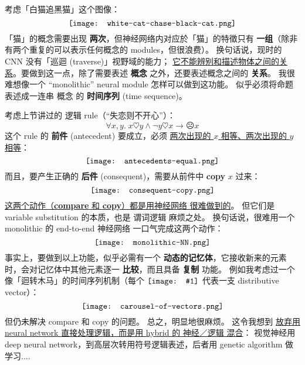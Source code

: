 \documentclass[12pt, orivec]{article}
\newcommand*\NewSym[1]{\vcenter{\hbox{\texttt{[image: \#1]}}}}
\begin{document}
考虑「白猫追黑猫」这个图像：
\begin{equation}
\vcenter{\hbox{\texttt{[image: white-cat-chase-black-cat.png]}}}
\end{equation}
「猫」的概念需要出现 \textbf{两次}，但神经网络内对应於「猫」的特徵只有 \textbf{一组}（除非有两个重复的可以表示任何概念的 modules，但很浪费）。 换句话说，现时的 CNN 没有「巡迴 (traverse)」视野域的能力； \uline{它不能辨别和描述物体之间的关系}。要做到这一点，除了需要表述 \textbf{概念} 之外，还要表述概念之间的 \textbf{关系}。 我很难想像一个 ``monolithic'' neural module 怎样可以做到这功能。 似乎必须将命题表述成一连串 概念 的 \textbf{时间序列} (time sequence)。

考虑上节讲过的 逻辑 rule（``失恋则不开心''）：
\begin{equation}
\forall x,y. \; x \heartsuit y \wedge \neg y \heartsuit x \rightarrow \frownie{} x
\end{equation}
这个 rule 的 \textbf{前件} (antecedent) 要成立，必须 \uline{两次出现的 $x$ 相等、两次出现的 $y$ 相等}：
\begin{equation}
\vcenter{\hbox{\texttt{[image: antecedents-equal.png]}}}
\end{equation}
而且，要产生正确的 \textbf{后件} (consequent)，需要从前件中 \textbf{copy} $x$ 过来：
\begin{equation}
\vcenter{\hbox{\texttt{[image: consequent-copy.png]}}}
\end{equation}
\uline{这两个动作（\textbf{compare} 和 \textbf{copy}）都是用神经网络 很难做到的}。  但它们是 variable substitution 的本质，也是 谓词逻辑 麻烦之处。 换句话说，很难用一个 monolithic 的 end-to-end 神经网络 一口气完成这两个动作：
\begin{equation}
\vcenter{\hbox{\texttt{[image: monolithic-NN.png]}}}
\end{equation}
事实上，要做到以上功能，似乎必需有一个 \textbf{动态的记忆体}，它接收新来的元素时，会对记忆体中其他元素逐一 \textbf{比较}，而且具备 \textbf{复制} 功能。  例如我考虑过一个像「迴转木马」的时间序列机制（每个 $\NewSym{distributive-vector.png}$ 代表一支 distributive vector）：
\begin{equation}
\vcenter{\hbox{\texttt{[image: carousel-of-vectors.png]}}}
\end{equation}
但仍未解决 compare 和 copy 的问题。 总之，明显地很麻烦。  这令我想到 \uline{放弃用 neural network 直接处理逻辑，而是用 hybrid 的 神经／逻辑 混合}： 视觉神经用 deep neural network，到高层次转用符号逻辑表述，后者用 genetic algorithm 做学习....
\end{document}
